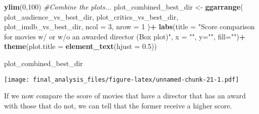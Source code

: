 \documentclass[]{article}
\newenvironment{Shaded}{\begin{snugshade}}{\end{snugshade}}
\newcommand{\KeywordTok}[1]{\textcolor[rgb]{0.13,0.29,0.53}{\textbf{#1}}}
\newcommand{\DataTypeTok}[1]{\textcolor[rgb]{0.13,0.29,0.53}{#1}}
\newcommand{\DecValTok}[1]{\textcolor[rgb]{0.00,0.00,0.81}{#1}}
\newcommand{\FloatTok}[1]{\textcolor[rgb]{0.00,0.00,0.81}{#1}}
\newcommand{\StringTok}[1]{\textcolor[rgb]{0.31,0.60,0.02}{#1}}
\newcommand{\CommentTok}[1]{\textcolor[rgb]{0.56,0.35,0.01}{\textit{#1}}}
\newcommand{\OperatorTok}[1]{\textcolor[rgb]{0.81,0.36,0.00}{\textbf{#1}}}
\newcommand{\NormalTok}[1]{#1}
\begin{document}
\begin{Shaded}
\begin{Highlighting}[]
\StringTok{  }\KeywordTok{ylim}\NormalTok{(}\DecValTok{0}\NormalTok{,}\DecValTok{100}\NormalTok{)}
\CommentTok{#Combine the plots...}
\NormalTok{plot_combined_best_dir <-}
\StringTok{  }\KeywordTok{ggarrange}\NormalTok{(}
\NormalTok{    plot_audience_vs_best_dir,}
\NormalTok{    plot_critics_vs_best_dir,}
\NormalTok{    plot_imdb_vs_best_dir,}
    \DataTypeTok{ncol =} \DecValTok{3}\NormalTok{,}
    \DataTypeTok{nrow =} \DecValTok{1}
\NormalTok{  )}\OperatorTok{+}
\StringTok{  }\KeywordTok{labs}\NormalTok{(}\DataTypeTok{title =} \StringTok{"Score comparison for movies w/ or w/o an awarded director (Box plot)"}\NormalTok{, }\DataTypeTok{x =} \StringTok{""}\NormalTok{, }\DataTypeTok{y=}\StringTok{""}\NormalTok{, }\DataTypeTok{fill=}\StringTok{""}\NormalTok{)}\OperatorTok{+}
\StringTok{  }\KeywordTok{theme}\NormalTok{(}\DataTypeTok{plot.title =} \KeywordTok{element_text}\NormalTok{(}\DataTypeTok{hjust =} \FloatTok{0.5}\NormalTok{))}

\NormalTok{plot_combined_best_dir}
\end{Highlighting}
\end{Shaded}

\texttt{[image: final\_analysis\_files/figure-latex/unnamed-chunk-21-1.pdf]}

If we now compare the score of movies that have a director that has an
award with those that do not, we can tell that the former receive a
higher score.
\end{document}
